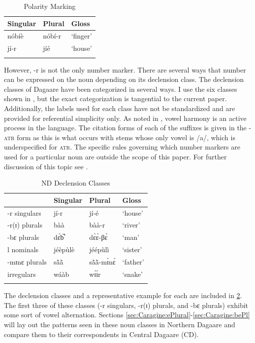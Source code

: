 \documentclass[output=paper,colorlinks,citecolor=brown,
]{langscibook}
\begin{document}
\begin{table}
  \caption{Polarity Marking}
  \label{tab:Caragine:polarity}
\begin{tabular}{lll}
\lsptoprule 
Singular & Plural & Gloss\\
\midrule\midrule
nóbíè & nóbí-r & `finger'\\
jí-r & jíé & `house'\\
\lspbottomrule 
\end{tabular}
\end{table}

However, -r is not the only number marker. There are several ways that number can be expressed on the noun depending on its declension class. The declension classes of Dagaare have been categorized in several ways. I use the six classes shown in , but the exact categorization is tangential to the current paper. Additionally, the labels used for each class have not be standardized and are provided for referential simplicity only. As noted in , vowel harmony is an active process in the language. The citation forms of each of the suffixes is given in the -\textsc{atr} form as this is what occurs with stems whose only vowel is /a/, which is underspecified for \textsc{atr}. The specific rules governing which number markers are used for a particular noun are outside the scope of this paper. For further discussion of this topic see \citet{Pruett}. 

\begin{table}
  \caption{ND Declension Classes}
  \label{tab:Caragine:classes}
\begin{tabular}{llll}
\lsptoprule 
& Singular & Plural & Gloss\\
\midrule\midrule
-r singulars & jí-r & jí-é & `house' \\
-r(ɪ) plurals &  bàà & bàà-r & `river' \\
-bɛ plurals & dɛ́b̚ & dɛ̀ɛ̀-βɛ̀ & `man'\\
l nominals &jéèpùlè &	jéépùlì & `sister'\\
-mɪnɛ plurals & sã̀ã̀ & sã̀ã̀-mɪ̀nɛ́ & `father'\\
irregulars & wáàb &	wɪ́ɪ́r &	`snake' \\

\lspbottomrule 
\end{tabular}
\end{table}

The declension classes and a representative example for each are included in \ref{tab:Caragine:classes}. The first three of these classes (-r singulars, -r(ɪ) plurals, and -bɛ plurals) exhibit some sort of vowel alternation. Sections \ref{sec:Caragine:ePlural}-\ref{sec:Caragine:bePl} will lay out the patterns seen in these noun classes in Northern Dagaare and compare them to their correspondents in Central Dagaare (CD).  
\end{document}
